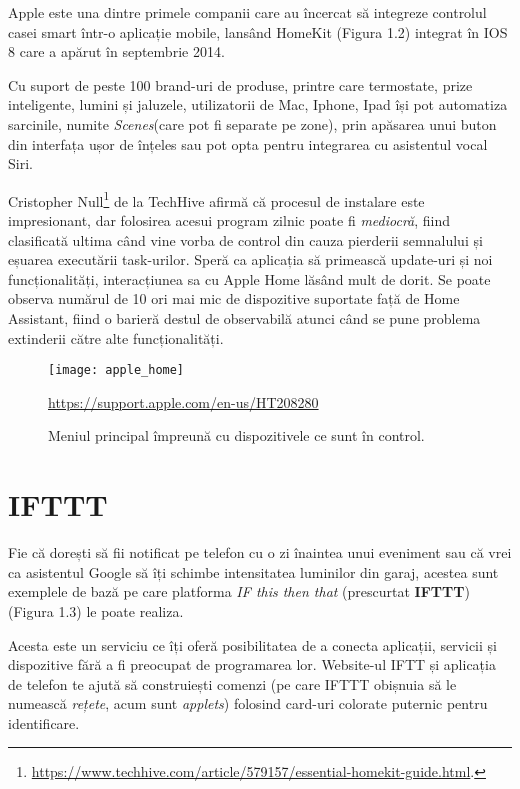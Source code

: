 Apple este una dintre primele companii care au încercat să integreze controlul casei smart într-o aplicație mobile, lansând HomeKit (Figura 1.2) integrat în IOS 8 care a apărut în septembrie 2014.

Cu suport de peste 100 brand-uri de produse, printre care termostate, prize inteligente, lumini și jaluzele, utilizatorii de Mac, Iphone, Ipad își pot automatiza sarcinile, numite \emph{Scenes}(care pot fi separate pe zone), prin apăsarea unui buton din interfața ușor de înțeles sau pot opta pentru integrarea cu asistentul vocal Siri.

Cristopher Null\footnote{\url{https://www.techhive.com/article/579157/essential-homekit-guide.html}.} de la TechHive afirmă că procesul de instalare este impresionant, dar folosirea acesui program zilnic poate fi \emph{mediocră}, fiind clasificată ultima când vine vorba de control din cauza pierderii semnalului și eșuarea executării task-urilor. Speră ca aplicația să primească update-uri și noi funcționalități, interacțiunea sa cu Apple Home lăsând mult de dorit. Se poate observa numărul de 10 ori mai mic de dispozitive suportate față de Home Assistant, fiind o barieră destul de observabilă atunci când se pune problema extinderii către alte funcționalități.

\begin{figure}[h]
	\centering
	\texttt{[image: apple\_home]}
	\caption{Meniul principal împreună cu dispozitivele ce sunt în control.}\url{https://support.apple.com/en-us/HT208280}
	\label{fig:apple_home}
\end{figure} 


\section{IFTTT}

Fie că dorești să fii notificat pe telefon cu o zi înaintea unui eveniment sau că vrei ca asistentul Google să îți schimbe intensitatea luminilor din garaj, acestea sunt exemplele de bază pe care platforma \emph{IF this then that} (prescurtat \textbf{IFTTT}) (Figura 1.3) le poate realiza.

Acesta este un serviciu ce îți oferă posibilitatea de a conecta aplicații, servicii și dispozitive fără a fi preocupat de programarea lor. Website-ul IFTT și aplicația de telefon te ajută să construiești comenzi (pe care IFTTT obișnuia să le numească \emph{rețete}, acum sunt \emph{applets}) folosind card-uri colorate puternic pentru identificare.

